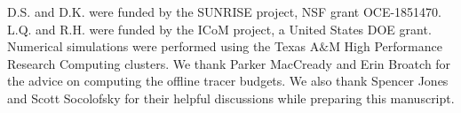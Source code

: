 \documentclass[draft]{agujournal2019}
\begin{document}
%
%

%

%

\acknowledgments
D.S. and D.K. were funded by the SUNRISE project, NSF grant OCE-1851470. L.Q. and R.H. were funded by the ICoM project, a United States DOE grant. Numerical simulations were performed using the Texas A$\&$M High Performance Research Computing clusters. We thank Parker MacCready and Erin Broatch for the advice on computing the offline tracer budgets. We also thank Spencer Jones and Scott Socolofsky for their helpful discussions while preparing this manuscript.



%
%

\end{document}
